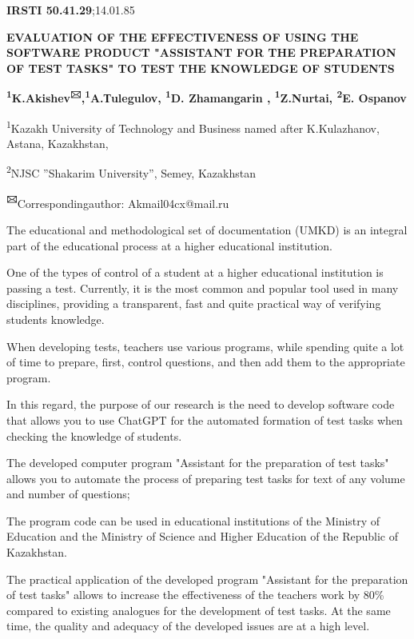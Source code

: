 \newpage
{\bfseries IRSTI 50.41.29};14.01.85

{\bfseries EVALUATION OF THE EFFECTIVENESS OF USING THE SOFTWARE PRODUCT
"ASSISTANT FOR THE PREPARATION OF TEST TASKS" TO TEST THE KNOWLEDGE OF
STUDENTS}

{\bfseries \textsuperscript{1}K.Akishev\textsuperscript{🖂},\textsuperscript{1}A.Тulegulov,
\textsuperscript{1}D. Zhamangarin , \textsuperscript{1}Z.Nurtai,
\textsuperscript{2}E. Ospanov}

\textsuperscript{1}Kazakh University of Technology and Business named
after K.Kulazhanov, Astana, Kazakhstan,

\textsuperscript{2}NJSC ''Shakarim University'', Semey, Kazakhstan

{\bfseries \textsuperscript{🖂}}Correspondingauthor: Akmail04cx@mail.ru

The educational and methodological set of documentation (UMKD) is an
integral part of the educational process at a higher educational
institution.

One of the types of control of a student at a higher educational
institution is passing a test. Currently, it is the most common and
popular tool used in many disciplines, providing a transparent, fast and
quite practical way of verifying students\textquotesingle{} knowledge.

When developing tests, teachers use various programs, while spending
quite a lot of time to prepare, first, control questions, and then add
them to the appropriate program.

In this regard, the purpose of our research is the need to develop
software code that allows you to use ChatGPT for the automated formation
of test tasks when checking the knowledge of students.

The developed computer program "Assistant for the preparation of test
tasks" allows you to automate the process of preparing test tasks for
text of any volume and number of questions;

The program code can be used in educational institutions of the Ministry
of Education and the Ministry of Science and Higher Education of the
Republic of Kazakhstan.

The practical application of the developed program "Assistant for the
preparation of test tasks" allows to increase the effectiveness of the
teacher\textquotesingle s work by 80\% compared to existing analogues
for the development of test tasks. At the same time, the quality and
adequacy of the developed issues are at a high level.

